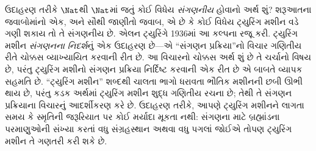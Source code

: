 
\label{guunit:OLP-0252}


\begingroup
\makeatletter{}\makeatother

\label{guunit:OLP-0253}


\begingroup
\makeatletter{}\makeatother

\label{guunit:OLP-0254}


ઉદાહરણ તરીકે $\Nat$થી $\Nat$માં જતું કોઈ વિધેય \emph{સંગણનીય}
હોવાનો અર્થ શું? શરૂઆતના જવાબોમાંનો એક, અને સૌથી જાણીતો જવાબ,
એ છે કે કોઈ વિધેય ટ્યુરિંગ મશીન વડે ગણી શકાય તો તે સંગણનીય છે.
એલન ટ્યુરિંગે 1936માં આ કલ્પના રજૂ કરી. ટ્યુરિંગ મશીન
\emph{સંગણનના નિદર્શ}નું એક ઉદાહરણ છે---એ ``સંગણન પ્રક્રિયા''નો
વિચાર ગણિતીય રીતે ચોક્કસ વ્યાખ્યાયિત કરવાની રીત છે. આ વિચારનો
ચોક્કસ અર્થ શું છે તે ચર્ચાનો વિષય છે, પરંતુ ટ્યુરિંગ મશીનો
સંગણન પ્રક્રિયા નિર્દિષ્ટ કરવાની એક રીત છે એ બાબતે વ્યાપક સહમતિ
છે. ``ટ્યુરિંગ મશીન'' શબ્દથી ચાલતા ભાગો ધરાવતા ભૌતિક મશીનની
છબી ઊભી થાય છે, પરંતુ કડક અર્થમાં ટ્યુરિંગ મશીન શુદ્ધ ગણિતીય
રચના છે; તેથી તે સંગણન પ્રક્રિયાના વિચારનું આદર્શીકરણ કરે છે.
ઉદાહરણ તરીકે, આપણે ટ્યુરિંગ મશીનને લાગતા સમય કે સ્મૃતિની
જરૂરિયાત પર કોઈ મર્યાદા મૂકતા નથી: સંગણના માટે બ્રહ્માંડના
પરમાણુઓની સંખ્યા કરતાં વધુ સંગ્રહસ્થાન અથવા વધુ પગલાં જોઈએ
તોપણ ટ્યુરિંગ મશીન તે ગણતરી કરી શકે છે.

